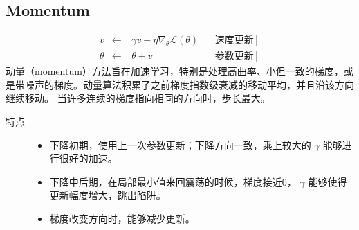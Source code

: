 \documentclass[letterpaper,10pt,english]{sphinxmanual}
\begin{document}
\subsection{Momentum}
\label{\detokenize{deepLearning/08_optimizer:momentum}}\begin{equation*}
\begin{split}v & \leftarrow &\  \gamma v - \eta \nabla_{\theta} \mathcal{L}(\theta) &\  [\text{速度更新}] \\
\theta & \leftarrow &\  \theta + v &\ [\text{参数更新}]\end{split}
\end{equation*}
动量（momentum）方法旨在加速学习，特别是处理高曲率、小但一致的梯度，或是带噪声的梯度。动量算法积累了之前梯度指数级衰减的移动平均，并且沿该方向继续移动。
当许多连续的梯度指向相同的方向时，步长最大。
\begin{description}
\item[{特点}] \leavevmode\begin{itemize}
\item {} 
下降初期，使用上一次参数更新；下降方向一致，乘上较大的 \(\gamma\) 能够进行很好的加速。

\item {} 
下降中后期，在局部最小值来回震荡的时候，梯度接近0， \(\gamma\) 能够使得更新幅度增大，跳出陷阱。

\item {} 
梯度改变方向时，能够减少更新。

\end{itemize}

\end{description}
\end{document}
